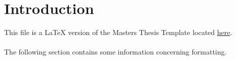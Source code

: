\section{Introduction}

\begin{flushleft}
    This file is a LaTeX version of the Masters Thesis Template located \href{http://msc-ai.iit.demokritos.gr/announcements/ekponisi-diplomatikon-ergasion-gia-akadimaiko-etos-2020-2021}{here}. \\~\\

    The following section contains some information concerning formatting.  
\end{flushleft}